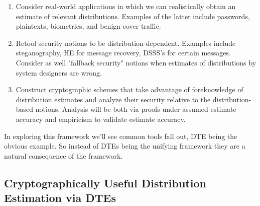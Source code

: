 




\iffalse
\begin{enumerate} 
\item Consider real-world applications in which we can realistically obtain an
estimate of relevant distributions. Examples of the latter include passwords,
plaintexts, biometrics, and benign cover traffic. 

\item Retool security notions to be distribution-dependent. Examples include
steganography, HE for message recovery, DSSS's for certain messages. Consider as
well "fallback security" notions when estimates of distributions by system
designers are wrong. 

\item Construct cryptographic schemes that take advantage of foreknowledge of distribution
estimates and analyze their security relative to the distribution-based notions.
Analysis will be both via proofs under assumed estimate accuracy and empiricism
to validate estimate accuracy.
\end{enumerate}

In exploring this framework we'll see common tools fall out, DTE being the
obvious example. So instead of DTEs being the unifying framework they are a
natural consequence of the framework. 

\subsection{Cryptographically Useful Distribution Estimation via DTEs}
\label{sec:dte}


